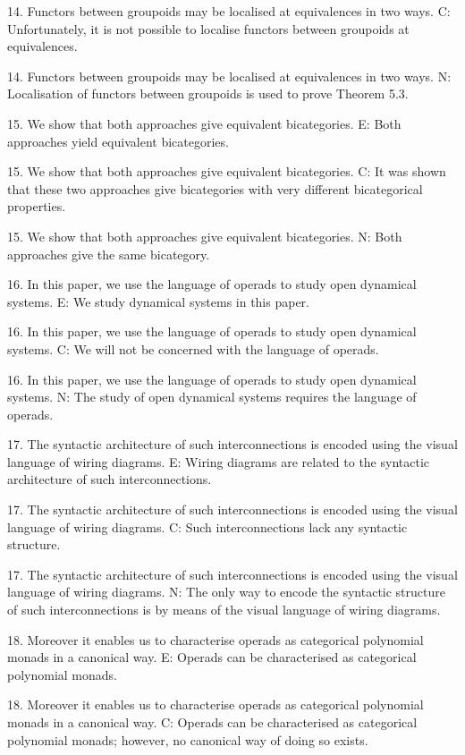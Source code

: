 14. Functors between groupoids may be localised at equivalences in two ways.
C: Unfortunately, it is not possible to localise functors between groupoids at equivalences.

14. Functors between groupoids may be localised at equivalences in two ways.
N: Localisation of functors between groupoids is used to prove Theorem 5.3.

15. We show that both approaches give equivalent bicategories.
E: Both approaches yield equivalent bicategories.

15. We show that both approaches give equivalent bicategories.
C: It was shown that these two approaches give bicategories with very different bicategorical properties.

15. We show that both approaches give equivalent bicategories.
N: Both approaches give the same bicategory.

16. In this paper, we use the language of operads to study open dynamical systems.
E: We study dynamical systems in this paper.

16. In this paper, we use the language of operads to study open dynamical systems.
C: We will not be concerned with the language of operads.

16. In this paper, we use the language of operads to study open dynamical systems.
N: The study of open dynamical systems requires the language of operads.

17. The syntactic architecture of such interconnections is encoded using the visual language of wiring diagrams.
E: Wiring diagrams are related to the syntactic architecture of such interconnections.

17. The syntactic architecture of such interconnections is encoded using the visual language of wiring diagrams.
C: Such interconnections lack any syntactic structure.

17. The syntactic architecture of such interconnections is encoded using the visual language of wiring diagrams.
N: The only way to encode the syntactic structure of such interconnections is by means of the visual language of wiring diagrams.

18.  Moreover it enables us to characterise operads as categorical polynomial monads in a canonical way.
E: Operads can be characterised as categorical polynomial monads.

18.  Moreover it enables us to characterise operads as categorical polynomial monads in a canonical way.
C: Operads can be characterised as categorical polynomial monads; however, no canonical way of doing so exists.

